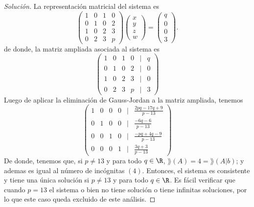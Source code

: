 \documentclass[a4,11pt]{aleph-notas}
\begin{document}
\begin{proof}[Solución]\hspace{0pt}
    La representación matricial del sistema es
    \[
    \begin{pmatrix}
                1&0&1&0\\0&1&0&2\\1&0&2&3\\0&2&3&p
                \end{pmatrix}
                \begin{pmatrix}
                x \\ y\\ z \\ w
                \end{pmatrix}
                =
                \begin{pmatrix}
                q \\ 0\\ 0\\ 3
                \end{pmatrix}.
    \]
    de donde, la matriz ampliada asociada al sistema es
    \[
                \begin{pmatrix}
                1&0&1&0&|&q\\
                0&1&0&2&|& 0\\
                1&0&2&3&|& 0\\
                0&2&3&p&|& 3
                \end{pmatrix} 
    \]
    Luego de aplicar la eliminación de Gauss-Jordan a la matriz ampliada, tenemos 
    \[
                \begin{pmatrix}
                1&0&0&0&|&\frac{2pq-17q+9}{p-13}\\
                0&1&0&0&|& \frac{-6q-6}{p-13}\\
                0&0&1&0&|& \frac{-pq+4q-9}{p-13}\\
                0&0&0&1&|& \frac{3q+3}{p-13}
                \end{pmatrix} 
    \]
    De donde, tenemos que, si $p \neq 13$ y para todo $q \in \R$, $\rang(A)=4 = \rang(A|b)$; y ademas es igual al número de incógnitas $(4)$. Entonces, el sistema es consistente y tiene una única solución si $p \neq 13$ y para todo $q \in \R$. Es fácil verificar que cuando $p=13$ el sistema o bien no tiene solución o tiene infinitas soluciones, por lo que este caso queda excluido de este análisis.
\end{proof}
\end{document}

